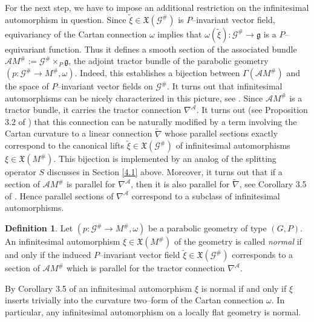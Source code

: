 \documentclass[12pt,a4paper]{amsart}
\def\frak{\mathfrak}
\def\Cal{\mathcal}
\newcommand{\x}{\times}
\newcommand{\om}{\omega}
\newcommand{\Ga}{\Gamma}
\newcounter{theorem}
\numberwithin{theorem}{section}
\theoremstyle{definition}
\newtheorem{definition}[theorem]{Definition}
\theoremstyle{remark}
\begin{document}
For the next step, we have to impose an additional restriction on the
infinitesimal automorphism in question. Since $\tilde\xi\in\frak
X(\Cal G^\#)$ is $P$--invariant vector field, equivariancy of the
Cartan connection $\om$ implies that $\om(\tilde\xi):\Cal G^\#\to\frak
g$ is a $P$--equivariant function. Thus it defines a smooth section of
the associated bundle $\Cal AM^\#:=\Cal G^\#\x_P\frak g$, the adjoint
tractor bundle of the parabolic geometry $(p:\Cal G^\#\to
M^\#,\om)$. Indeed, this establishes a bijection between $\Ga(\Cal
AM^\#)$ and the space of $P$--invariant vector fields on $\Cal
G^\#$. It turns out that infinitesimal automorphisms can be nicely
characterized in this picture, see \cite{deformations}. Since $\Cal
AM^\#$ is a tractor bundle, it carries the tractor connection
$\nabla^{\Cal A}$. It turns out (see Proposition 3.2 of
\cite{deformations}) that this connection can be naturally modified by
a term involving the Cartan curvature to a linear connection
$\tilde\nabla$ whose parallel sections exactly correspond to the
canonical lifts $\tilde\xi\in\frak X(\Cal G^\#)$ of infinitesimal
automorphisms $\xi\in\frak X(M^\#)$. This bijection is implemented by
an analog of the splitting operator $S$ discusses in Section \ref{4.1}
above. Moreover, it turns out that if a section of $\Cal AM^\#$ is
parallel for $\nabla^{\Cal A}$, then it is also parallel for
$\tilde\nabla$, see Corollary 3.5 of \cite{deformations}. Hence
parallel sections of $\nabla^{\Cal A}$ correspond to a subclass of
infinitesimal automorphisms.
\begin{definition}\label{def4.2}
  Let $(p:\Cal G^\#\to M^\#,\om)$ be a parabolic geometry of type
  $(G,P)$. An infinitesimal automorphism $\xi\in\frak X(M^\#)$ of the
  geometry is called \textit{normal} if and only if the induced
  $P$--invariant vector field $\tilde\xi\in\frak X(\Cal G^\#)$
  corresponds to a section of $\Cal AM^\#$ which is parallel for the
  tractor connection $\nabla^{\Cal A}$. 
\end{definition}
By Corollary 3.5 of \cite{deformations} an infinitesimal automorphism
$\xi$ is normal if and only if $\xi$ inserts trivially into the
curvature two--form of the Cartan connection $\om$. In particular, any
infinitesimal automorphism on a locally flat geometry is normal. 

\medskip
\end{document}
